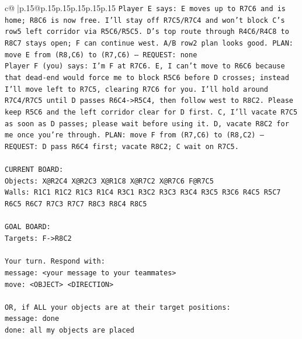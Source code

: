 \documentclass{article}
\begin{document}
{\begin{supertabular}{c@{$\;$}|p{.15\linewidth}@{}p{.15\linewidth}p{.15\linewidth}p{.15\linewidth}p{.15\linewidth}p{.15\linewidth}}
{{{\texttt{Player E says: E moves up to R7C6 and is home; R8C6 is now free. I’ll stay off R7C5/R7C4 and won’t block C’s row5 left corridor via R5C6/R5C5. D’s top route through R4C6/R4C8 to R8C7 stays open; F can continue west. A/B row2 plan looks good. PLAN: move E from (R8,C6) to (R7,C6) — REQUEST: none} \\
\texttt{Player F (you) says: I'm F at R7C6. E, I can't move to R6C6 because that dead{-}end would force me to block R5C6 before D crosses; instead I'll move left to R7C5, clearing R7C6 for you. I'll hold around R7C4/R7C5 until D passes R6C4{-}>R5C4, then follow west to R8C2. Please keep R5C6 and the left corridor clear for D first. C, I'll vacate R7C5 as soon as D passes; please wait before using it. D, vacate R8C2 for me once you're through. PLAN: move F from (R7,C6) to (R8,C2) — REQUEST: D pass R6C4 first; vacate R8C2; C wait on R7C5.} \\
\\ 
\texttt{CURRENT BOARD:} \\
\texttt{Objects: X@R2C4 X@R2C3 X@R1C8 X@R7C2 X@R7C6 F@R7C5} \\
\texttt{Walls: R1C1 R1C2 R1C3 R1C4 R3C1 R3C2 R3C3 R3C4 R3C5 R3C6 R4C5 R5C7 R6C5 R6C7 R7C3 R7C7 R8C3 R8C4 R8C5} \\
\\ 
\texttt{GOAL BOARD:} \\
\texttt{Targets: F{-}>R8C2} \\
\\ 
\texttt{Your turn. Respond with:} \\
\texttt{message: <your message to your teammates>} \\
\texttt{move: <OBJECT> <DIRECTION>} \\
\\ 
\texttt{OR, if ALL your objects are at their target positions:} \\
\texttt{message: done} \\
\texttt{done: all my objects are placed} \\
            }
        }
    }
     \\ \\


\end{supertabular}}
\end{document}
